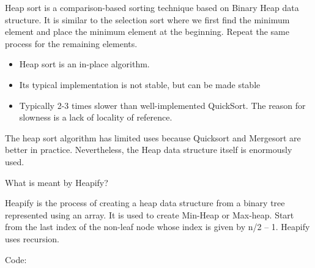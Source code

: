         Heap sort is a comparison-based sorting technique based on Binary Heap data structure. It is similar to the selection sort where we first find the minimum element and place the minimum element at the beginning. Repeat the same process for the remaining elements.

    \begin{itemize} 
                \item Heap sort is an in-place algorithm. 
                \item Its typical implementation is not stable, but can be made stable
                \item Typically 2-3 times slower than well-implemented QuickSort.  The reason for slowness is a lack of locality of reference.
            \end{itemize}
        The heap sort algorithm has limited uses because Quicksort and Mergesort are better in practice. Nevertheless, the Heap data structure itself is enormously used.

        What is meant by Heapify? 

        Heapify is the process of creating a heap data structure from a binary tree represented using an array. It is used to create Min-Heap or Max-heap. Start from the last index of the non-leaf node whose index is given by n/2 – 1. Heapify uses recursion.

    

\noindent Code:

